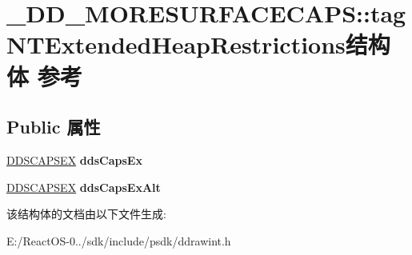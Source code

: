 \hypertarget{struct___d_d___m_o_r_e_s_u_r_f_a_c_e_c_a_p_s_1_1tag_n_t_extended_heap_restrictions}{}\section{\+\_\+\+D\+D\+\_\+\+M\+O\+R\+E\+S\+U\+R\+F\+A\+C\+E\+C\+A\+PS\+:\+:tag\+N\+T\+Extended\+Heap\+Restrictions结构体 参考}
\label{struct___d_d___m_o_r_e_s_u_r_f_a_c_e_c_a_p_s_1_1tag_n_t_extended_heap_restrictions}
\subsection*{Public 属性}
\begin{DoxyCompactItemize}
\item 
\mbox{\label{struct___d_d___m_o_r_e_s_u_r_f_a_c_e_c_a_p_s_1_1tag_n_t_extended_heap_restrictions_af6b3181cc227729d377cf48386003623}} 
\hyperlink{struct___d_d_s_c_a_p_s_e_x}{D\+D\+S\+C\+A\+P\+S\+EX} {\bfseries dds\+Caps\+Ex}
\item 
\mbox{\label{struct___d_d___m_o_r_e_s_u_r_f_a_c_e_c_a_p_s_1_1tag_n_t_extended_heap_restrictions_ad8df27f76cf8295c20621c1b45cebace}} 
\hyperlink{struct___d_d_s_c_a_p_s_e_x}{D\+D\+S\+C\+A\+P\+S\+EX} {\bfseries dds\+Caps\+Ex\+Alt}
\end{DoxyCompactItemize}


该结构体的文档由以下文件生成\+:\begin{DoxyCompactItemize}
\item 
E\+:/\+React\+O\+S-\/0../sdk/include/psdk/ddrawint.\+h\end{DoxyCompactItemize}
